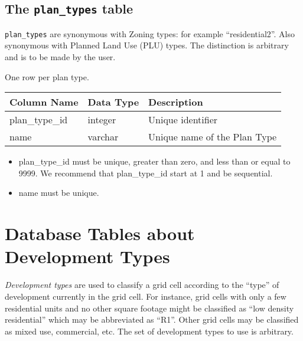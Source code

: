 \subsection{The {\tt plan_types} table}

\verb|plan_types| are synonymous with Zoning types: for example
``residential2''. Also synonymous with Planned Land Use (PLU) types. The
distinction is arbitrary and is to be made by the user.

One row per plan type.

\begin{tabular}{lll}
\textbf{Column Name} & \textbf{Data Type} & \textbf{Description} \\
\hline
plan_type_id & integer & Unique identifier  \\
\hline
name & varchar & Unique name of the Plan Type  \\
\hline

\end{tabular}

\begin{itemize} \tight
\item plan_type_id must be unique, greater than zero, and less than or equal to 9999.
We recommend that plan_type_id start at 1 and be sequential.
\item name must be unique.

\end{itemize}


\section{Database Tables about Development Types}
\label{sec:development-tables}



\emph{Development types} are used to classify a grid cell according to the
``type'' of development currently in the grid cell.  For instance, grid cells
with only a few residential units and no other square footage might be
classified as ``low density residential'' which may be abbreviated as ``R1''.
Other grid cells may be classified as mixed use, commercial, etc.  The set of
development types to use is arbitrary.

